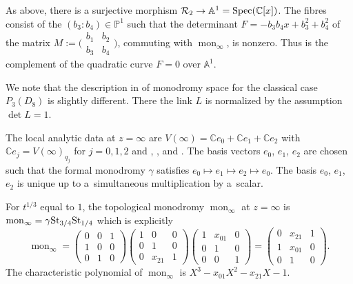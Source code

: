 \documentclass[10pt,a4paper]{amsart}
\numberwithin{equation}{section}
\begin{document}
As above, there is a surjective morphism $\mathcal{R}_2\rightarrow \mathbb{A}^1={\rm Spec}(\mathbb{C}[x])$. The fibres consist of the $(b_3:b_4)\in \mathbb{P}^1$ such that the determinant
 $F=-b_3b_4x + b_3^2 + b_4^2$ of the matrix $M:=\bigl(\begin{smallmatrix}b_1 &b_2\\ b_3& b_4\end{smallmatrix}\bigr)$,
 commuting with $\operatorname{mon}_\infty$, is nonzero. Thus  is the complement of the quadratic curve $F=0$ over $\mathbb{A}^1$.

 We note that the description in \cite[Section~3.6]{vdP-Sa} of monodromy space for the classical case~$P_{3}(D_8)$ is slightly different.
 There the link $L$ is normalized by the assumption $\det L=1$.

\begin{Example} The local analytic data at $z=\infty$ are
$V(\infty)=\mathbb{C}e_0+\mathbb{C}e_1+\mathbb{C}e_2$
with $\mathbb{C}e_j=V(\infty)_{q_j}$ for $j=0,1,2$ and , ,  and
. The basis vectors $e_0$, $e_1$, $e_2$ are chosen such that
 the formal monodromy $\gamma$ satisfies $e_0\mapsto e_1\mapsto e_2\mapsto e_0$.
 The basis $e_0$, $e_1$, $e_2$ is unique up to a~simultaneous multiplication by a~scalar.
\end{Example}
For $t^{1/3}$ equal to $1$, the topological monodromy $\operatorname{mon}_\infty$ at $z=\infty$
is $\operatorname{mon}_{\infty}=\gamma {\rm St}_{3/4} {\rm St}_{1/4}$ which is explicitly
\[\operatorname{mon}_\infty=\begin{pmatrix}0 &0 &1 \\ 1&0 &0 \\ 0&1 &0 \end{pmatrix}
\begin{pmatrix}1 &0 &0 \\ 0& 1&0 \\ 0& x_{21}&1 \end{pmatrix}
\begin{pmatrix}1&x_{01} &0 \\ 0&1 &0 \\ 0& 0&1 \end{pmatrix}=
\begin{pmatrix} 0&x_{21} &1 \\ 1&x_{01} &0 \\ 0& 1&0 \end{pmatrix}.\]
 The characteristic polynomial of $\operatorname{mon}_\infty$ is $X^3-x_{01}X^2-x_{21}X-1$.
\end{document}
